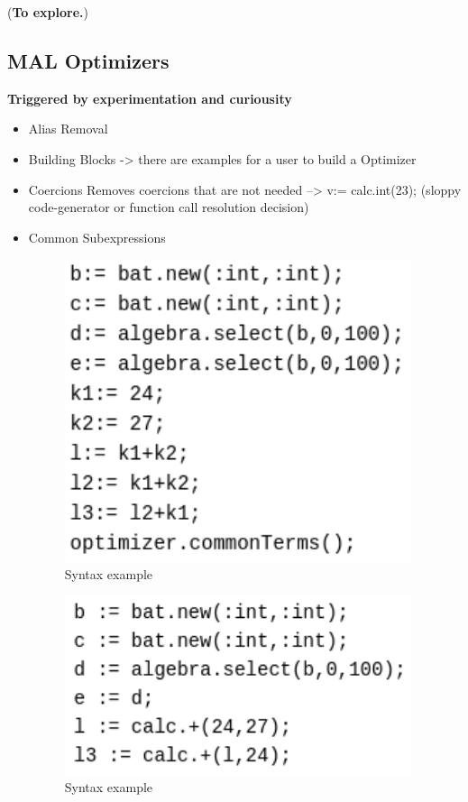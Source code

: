 \documentclass[11pt]{article}
\begin{document}
(\textbf{To explore.})

\subsection{MAL Optimizers}
\label{sec:orgf2a29dd}
\textbf{Triggered by experimentation and curiousity}

\begin{itemize}
\item Alias Removal
\item Building Blocks -> there are examples for a user to build a Optimizer
\item Coercions
Removes coercions that are not needed --> v:= calc.int(23);
(sloppy code-generator or function call resolution decision)

\item Common Subexpressions
\begin{figure}[htbp]
\centering
\includegraphics[width=4.0in]{./Pictures/opt-common-subs-1.png}
\caption{\label{fig:org96b654f}
Syntax example}
\end{figure}              \begin{figure}[htbp]
\centering
\includegraphics[width=4.0in]{./Pictures/opt-common-subs-1+.png}
\caption{\label{fig:org96b654f}
Syntax example}
\end{figure}


\end{itemize}
\end{document}
